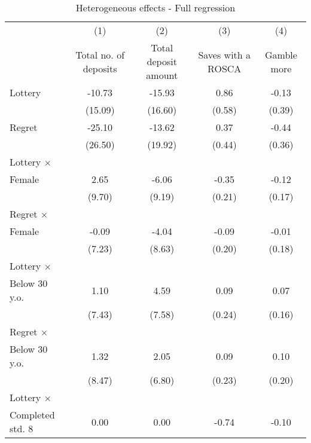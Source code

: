 \begin{table}[htbp]\centering
\def\sym#1{\ifmmode^{#1}\else\(^{#1}\)\fi}
\caption{Heterogeneous effects - Full regression}
\begin{tabular}{l*{4}{c}}
\toprule
                &\multicolumn{1}{c}{(1)}&\multicolumn{1}{c}{(2)}&\multicolumn{1}{c}{(3)}&\multicolumn{1}{c}{(4)}\\
                &\multicolumn{1}{c}{Total no. of deposits}&\multicolumn{1}{c}{Total deposit amount}&\multicolumn{1}{c}{Saves with a ROSCA}&\multicolumn{1}{c}{Gamble more}\\
\midrule
Lottery         &   -10.73         &   -15.93         &     0.86         &    -0.13         \\
                &  (15.09)         &  (16.60)         &   (0.58)         &   (0.39)         \\
\addlinespace
Regret          &   -25.10         &   -13.62         &     0.37         &    -0.44         \\
                &  (26.50)         &  (19.92)         &   (0.44)         &   (0.36)         \\
\addlinespace
Lottery $\times$ \\ Female&     2.65         &    -6.06         &    -0.35         &    -0.12         \\
                &   (9.70)         &   (9.19)         &   (0.21)         &   (0.17)         \\
\addlinespace
Regret $\times$ \\ Female&    -0.09         &    -4.04         &    -0.09         &    -0.01         \\
                &   (7.23)         &   (8.63)         &   (0.20)         &   (0.18)         \\
\addlinespace
Lottery $\times$ \\ Below 30 y.o.&     1.10         &     4.59         &     0.09         &     0.07         \\
                &   (7.43)         &   (7.58)         &   (0.24)         &   (0.16)         \\
\addlinespace
Regret $\times$ \\ Below 30 y.o.&     1.32         &     2.05         &     0.09         &     0.10         \\
                &   (8.47)         &   (6.80)         &   (0.23)         &   (0.20)         \\
\addlinespace
Lottery $\times$ \\ Completed std. 8&     0.00         &     0.00         &    -0.74         &    -0.10         \\

\end{tabular}
\end{table}
